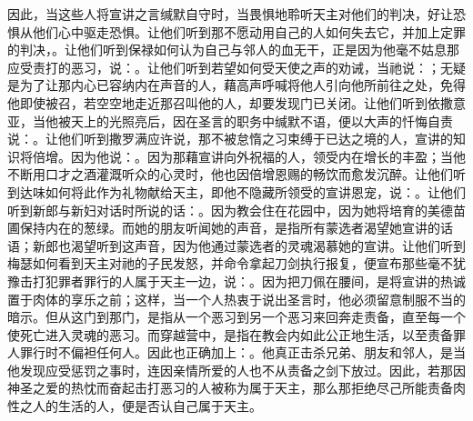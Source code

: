 因此，当这些人将宣讲之言缄默自守时，当畏惧地聆听天主对他们的判决，好让恐惧从他们心中驱走恐惧。让他们听到那不愿动用自己的人如何失去它，并加上定罪的判决，。让他们听到保禄如何认为自己与邻人的血无干，正是因为他毫不姑息那应受责打的恶习，说：。让他们听到若望如何受天使之声的劝诫，当祂说：；无疑是为了让那内心已容纳内在声音的人，藉高声呼喊将他人引向他所前往之处，免得他即使被召，若空空地走近那召叫他的人，却要发现门已关闭。让他们听到依撒意亚，当他被天上的光照亮后，因在圣言的职务中缄默不语，便以大声的忏悔自责说：。让他们听到撒罗满应许说，那不被怠惰之习束缚于已达之境的人，宣讲的知识将倍增。因为他说：。因为那藉宣讲向外祝福的人，领受内在增长的丰盈；当他不断用口才之酒灌溉听众的心灵时，他也因倍增恩赐的畅饮而愈发沉醉。让他们听到达味如何将此作为礼物献给天主，即他不隐藏所领受的宣讲恩宠，说：。让他们听到新郎与新妇对话时所说的话：。因为教会住在花园中，因为她将培育的美德苗圃保持内在的葱绿。而她的朋友听闻她的声音，是指所有蒙选者渴望她宣讲的话语；新郎也渴望听到这声音，因为他通过蒙选者的灵魂渴慕她的宣讲。让他们听到梅瑟如何看到天主对祂的子民发怒，并命令拿起刀剑执行报复，便宣布那些毫不犹豫击打犯罪者罪行的人属于天主一边，说：。因为把刀佩在腰间，是将宣讲的热诚置于肉体的享乐之前；这样，当一个人热衷于说出圣言时，他必须留意制服不当的暗示。但从这门到那门，是指从一个恶习到另一个恶习来回奔走责备，直至每一个使死亡进入灵魂的恶习。而穿越营中，是指在教会内如此公正地生活，以至责备罪人罪行时不偏袒任何人。因此也正确加上：。他真正击杀兄弟、朋友和邻人，是当他发现应受惩罚之事时，连因亲情所爱的人也不从责备之剑下放过。因此，若那因神圣之爱的热忱而奋起击打恶习的人被称为属于天主，那么那拒绝尽己所能责备肉性之人的生活的人，便是否认自己属于天主。\par

